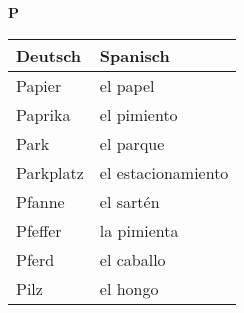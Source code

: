 \begin{flushright}\begin{Huge}\textbf{P}\end{Huge}\end{flushright}

\begin{longtable}{p{} p{}} 
\textbf{Deutsch}     & \textbf{Spanisch}                                       \\ \hline
\hline
\endhead %
Papier & el papel \\
Paprika & el pimiento\\
Park & el parque \\
Parkplatz & el estacionamiento \\
Pfanne & el sartén\\
Pfeffer & la pimienta\\
Pferd & el caballo\\
Pilz & el hongo\\

\end{longtable}
